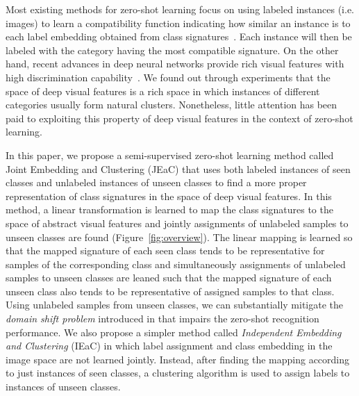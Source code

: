 \documentclass[10pt,twocolumn,letterpaper]{article}
\begin{document}
Most existing methods for zero-shot learning focus on using labeled instances (i.e. images) to learn a compatibility function indicating how similar an instance is
to each label embedding obtained from class signatures~\cite{Akata2015,emb15,sse}. Each instance will then be labeled with the category having the most compatible signature.
 On the other hand, recent advances in deep neural networks provide rich visual features with high discrimination capability~\cite{vgg}.
We found out through experiments that the space of deep visual features is a rich space in which instances of different categories usually form natural clusters.
Nonetheless, little attention has been paid to exploiting this property of deep visual features in the context of zero-shot learning.


In this paper, we propose a semi-supervised zero-shot
learning method called Joint Embedding and Clustering (JEaC) that uses both labeled instances of seen
classes and unlabeled instances of unseen classes to find a
more proper representation of class signatures in the space of deep visual features. In this method, a linear transformation
is learned to map the class signatures to the space of
abstract visual features and jointly assignments of unlabeled
samples to unseen classes are found (Figure~\ref{fig:overview}).
The linear mapping is learned so that the mapped signature of each seen class tends to be representative
for samples of the corresponding class and simultaneously
assignments of unlabeled samples to unseen classes are leaned such that the mapped signature of each unseen class
 also tends to be representative of assigned samples to that class.
 Using unlabeled samples from unseen classes, we can substantially mitigate
the \textit{domain shift problem} introduced in \cite{eccv14} that impairs the zero-shot recognition performance.
We also propose a simpler method called \textit{Independent Embedding and Clustering} (IEaC) in which label assignment and class embedding in the image space are not learned jointly. Instead,
after finding the mapping according to just instances of seen
classes, a clustering algorithm is used to assign labels to instances
of unseen classes.
\end{document}
